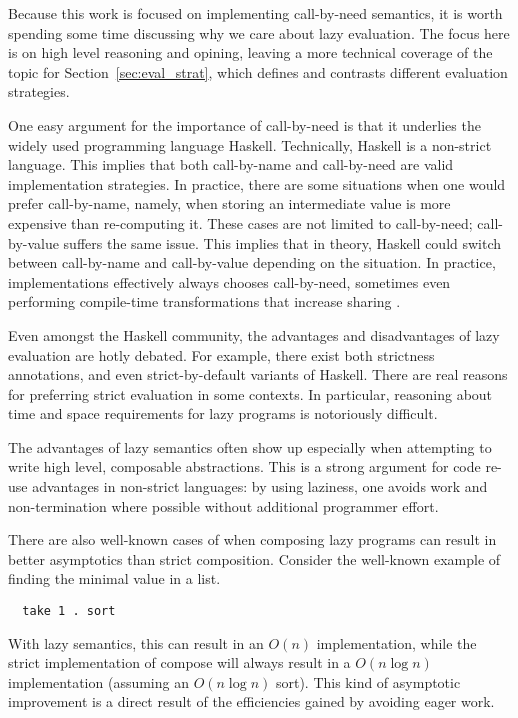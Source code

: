 Because this work is focused on implementing call-by-need semantics, it is worth
spending some time discussing why we care about lazy evaluation. The focus here
is on high level reasoning and opining, leaving a more technical coverage
of the topic for Section~\ref{sec:eval_strat}, which defines and contrasts
different evaluation strategies.

One easy argument for the importance of call-by-need is that it underlies the
widely used programming language Haskell. Technically, Haskell is a non-strict
language.  This implies that both call-by-name and call-by-need are valid
implementation strategies. In practice, there are some situations when one would
prefer call-by-name, namely, when storing an intermediate value is more
expensive than re-computing it. These cases are not limited to call-by-need;
call-by-value suffers the same issue.  This implies that in theory, Haskell
could switch between call-by-name and call-by-value depending on the situation.
In practice, implementations effectively always chooses call-by-need, sometimes
even performing compile-time transformations that increase sharing
\cite{jones96floating}.  

Even amongst the Haskell community, the advantages and disadvantages of
lazy evaluation are hotly debated. For example, there exist both strictness
annotations, and even strict-by-default variants of Haskell. There are real
reasons for preferring strict evaluation in some contexts. In particular,
reasoning about time and space requirements for lazy programs is notoriously
difficult.  

The advantages of lazy semantics often show up especially when attempting to
write high level, composable abstractions. This is a strong argument for code
re-use advantages in non-strict languages: by using laziness, one avoids work
and non-termination where possible without additional programmer effort.

There are also well-known cases of when composing lazy programs can result in
better asymptotics than strict composition. Consider the well-known example of
finding the minimal value in a list. 
\begin{verbatim}
  take 1 . sort
\end{verbatim}
With lazy semantics, this can result in an $O(n)$ implementation, while the
strict implementation of compose will always result in a $O(n \log n)$ 
implementation (assuming an $O(n \log n)$ sort). This kind of asymptotic
improvement is a direct result of the efficiencies gained by avoiding eager
work. 


